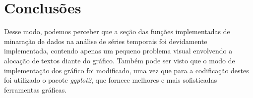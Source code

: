 \documentclass[12pt,letterpaper]{article}
\begin{document}
\section{Conclusões\label{conclusions}}

Desse modo, podemos perceber que a seção das funções implementadas de minaração de dados na análise de séries temporais foi devidamente implementada, contendo apenas um pequeno problema visual envolvendo a alocação de textos diante do gráfico. Também pode ser visto que o modo de implementação dos gráfico foi modificado, uma vez que para a codificação destes foi utilizado o pacote \textit{ggplot2}, que fornece melhores e mais sofisticadas ferramentas gráficas.
\end{document}
